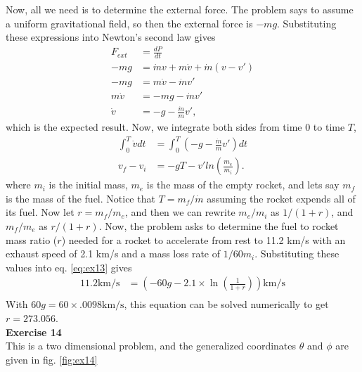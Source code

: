 \documentclass[10pt]{article}
\begin{document}
Now, all we need is to determine the external force.  The problem says to assume
a uniform gravitational field, so then the external force is $-mg$.  Substituting
these expressions into Newton's second law gives
\begin{align*}
  F_{ext} &= \frac{dP}{dt}\\
  -mg &= \dot mv + m\dot v + \dot m(v-v')\\
  -mg &= m\dot v - \dot mv'\\
  m\dot v &= -mg - \dot mv'\\
  \dot v &= -g - \frac{\dot m}{m}v',
\end{align*}
which is the expected result.  Now, we integrate both sides from time 0 to time $T$, 
\begin{align}
  \int_0^T\dot vdt &= \int_0^T(-g - \frac{\dot m}{m}v')dt\nonumber\\
  v_f-v_i &= -gT - v'ln\left( \frac{m_e}{m_i} \right).
  \label{eq:ex13}
\end{align}
where $m_i$ is the initial mass, $m_e$ is the mass of the empty rocket, and
lets say $m_f$ is the mass of the fuel.  Notice that $T=m_f/\dot m$ assuming
the rocket expends all of its fuel.  Now let $r=m_f/m_e$, and then we can
rewrite $m_e/m_i$ as $1/(1+r)$, and $m_f/m_e$ as $r/(1+r)$.  Now, the problem
asks to determine the fuel to rocket mass ratio ($r$) needed for a rocket to
accelerate from rest to 11.2 km/s with an exhaust speed of 2.1 km/s and a mass
loss rate of $1/60 m_i$. Substituting these values into eq. \ref{eq:ex13} gives
\begin{align*}
  11.2\mathrm{km/s} &= \left( -60g - 2.1\times\ln\left( \frac{1}{1+r} \right)\right)\mathrm{km/s}\\
\end{align*}
With $60g=60\times.0098 \mathrm{km/s}$, this equation can be solved numerically to get $r=273.056$.\\
\textbf{Exercise 14}\\
This is a two dimensional problem, and the generalized coordinates $\theta$ and $\phi$ are given in fig. \ref{fig:ex14}
\end{document}
